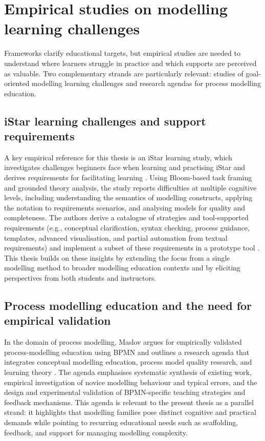 \section{Empirical studies on modelling learning challenges}
\label{sec:rw_empirical_challenges}

Frameworks clarify educational targets, but empirical studies are needed to understand where learners struggle in practice and which supports are perceived as valuable. Two complementary strands are particularly relevant: studies of goal-oriented modelling learning challenges and research agendas for process modelling education.

\subsection{iStar learning challenges and support requirements}
\label{subsec:rw_istar_learning}

A key empirical reference for this thesis is an iStar learning study, which investigates challenges beginners face when learning and practising iStar and derives requirements for facilitating learning \cite{istar-learning}. Using Bloom-based task framing and grounded theory analysis, the study reports difficulties at multiple cognitive levels, including understanding the semantics of modelling constructs, applying the notation to requirements scenarios, and analysing models for quality and completeness. The authors derive a catalogue of strategies and tool-supported requirements (e.g., conceptual clarification, syntax checking, process guidance, templates, advanced visualisation, and partial automation from textual requirements) and implement a subset of these requirements in a prototype tool \cite{istar-learning}. This thesis builds on these insights by extending the focus from a single modelling method to broader modelling education contexts and by eliciting perspectives from both students and instructors.

\subsection{Process modelling education and the need for empirical validation}
\label{subsec:rw_bpmn_education}

In the domain of process modelling, Maslov argues for empirically validated process-modelling education using BPMN and outlines a research agenda that integrates conceptual modelling education, process model quality research, and learning theory \cite{bpmn-education}. The agenda emphasises systematic synthesis of existing work, empirical investigation of novice modelling behaviour and typical errors, and the design and experimental validation of BPMN-specific teaching strategies and feedback mechanisms. This agenda is relevant to the present thesis as a parallel strand: it highlights that modelling families pose distinct cognitive and practical demands while pointing to recurring educational needs such as scaffolding, feedback, and support for managing modelling complexity.

